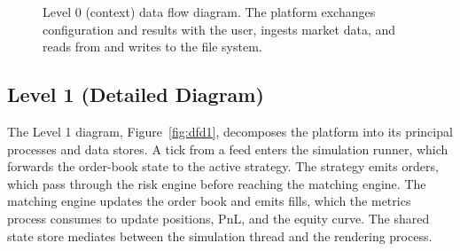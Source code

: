 \documentclass[12pt,oneside,a4paper]{report}
\begin{document}
\begin{figure}[H]
\centering
{}
\caption[Level 0 (context) data flow diagram]{Level 0 (context) data flow diagram. The platform exchanges configuration and results with the user, ingests market data, and reads from and writes to the file system.}
\label{fig:dfd0}
\end{figure}

\subsection{Level 1 (Detailed Diagram)}

The Level 1 diagram, Figure~\ref{fig:dfd1}, decomposes the platform into its principal processes and data stores. A tick from a feed enters the simulation runner, which forwards the order-book state to the active strategy. The strategy emits orders, which pass through the risk engine before reaching the matching engine. The matching engine updates the order book and emits fills, which the metrics process consumes to update positions, PnL, and the equity curve. The shared state store mediates between the simulation thread and the rendering process.
\end{document}
